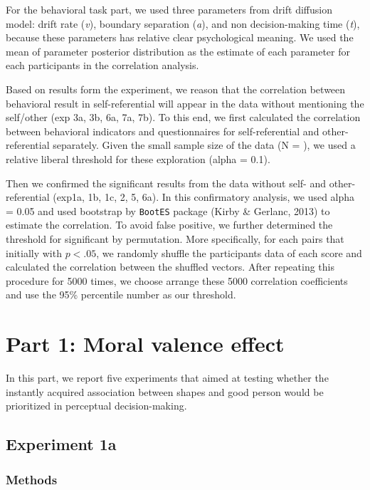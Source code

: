 \documentclass[
  english,
  man]{apa6}
\begin{document}
For the behavioral task part, we used three parameters from drift diffusion model: drift rate (\emph{v}), boundary separation (\emph{a}), and non decision-making time (\emph{t}), because these parameters has relative clear psychological meaning. We used the mean of parameter posterior distribution as the estimate of each parameter for each participants in the correlation analysis.

Based on results form the experiment, we reason that the correlation between behavioral result in self-referential will appear in the data without mentioning the self/other (exp 3a, 3b, 6a, 7a, 7b). To this end, we first calculated the correlation between behavioral indicators and questionnaires for self-referential and other-referential separately. Given the small sample size of the data (N = ), we used a relative liberal threshold for these exploration (alpha = 0.1).

Then we confirmed the significant results from the data without self- and other-referential (exp1a, 1b, 1c, 2, 5, 6a). In this confirmatory analysis, we used alpha = 0.05 and used bootstrap by \texttt{BootES} package (Kirby \& Gerlanc, 2013) to estimate the correlation. To avoid false positive, we further determined the threshold for significant by permutation. More specifically, for each pairs that initially with \(p < .05\), we randomly shuffle the participants data of each score and calculated the correlation between the shuffled vectors. After repeating this procedure for 5000 times, we choose arrange these 5000 correlation coefficients and use the 95\% percentile number as our threshold.

\hypertarget{part-1-moral-valence-effect}{%
\section{Part 1: Moral valence effect}\label{part-1-moral-valence-effect}}

In this part, we report five experiments that aimed at testing whether the instantly acquired association between shapes and good person would be prioritized in perceptual decision-making.

\hypertarget{experiment-1a}{%
\subsection{Experiment 1a}\label{experiment-1a}}

\hypertarget{methods}{%
\subsubsection{Methods}\label{methods}}
\end{document}
